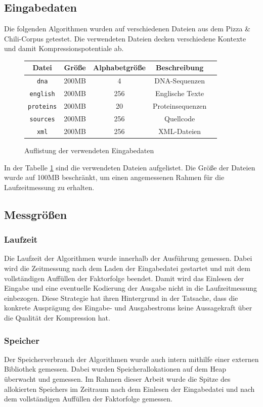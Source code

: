 \subsection{Eingabedaten}
Die folgenden Algorithmen wurden auf verschiedenen Dateien aus dem Pizza \& Chili-Corpus getestet. Die verwendeten Dateien decken verschiedene Kontexte und damit
Kompressionspotentiale ab.
\begin{figure}[ht]
    \centering
    \caption{Auflistung der verwendeten Eingabedaten}
    \label{inputdata}
    \begin{tabular}{|c|c|c|c|c|}
        \hline
        \textbf{Datei} & \textbf{Größe} & \textbf{Alphabetgröße} & \textbf{Beschreibung} \\
        \hline
        \texttt{dna} & 200MB & 4 & DNA-Sequenzen \\
        \hline
        \texttt{english} & 200MB & 256 & Englische Texte \\
        \hline
        \texttt{proteins} & 200MB & 20 & Proteinsequenzen \\
        \hline
        \texttt{sources} & 200MB & 256 & Quellcode \\
        \hline
        \texttt{xml} & 200MB & 256 & XML-Dateien \\
        \hline
    \end{tabular}
\end{figure}
In der Tabelle \ref{inputdata} sind die verwendeten Dateien aufgelistet. Die Größe der Dateien wurde auf 100MB beschränkt, um einen angemessenen Rahmen für die 
Laufzeitmessung zu erhalten.

\subsection{Messgrößen}

\subsubsection{Laufzeit}
Die Laufzeit der Algorithmen wurde innerhalb der Ausführung gemessen. Dabei wird die Zeitmessung nach dem Laden der Eingabedatei gestartet und mit dem vollständigen
Auffüllen der Faktorfolge beendet. Damit wird das Einlesen der Eingabe und eine eventuelle Kodierung der Ausgabe nicht in die Laufzeitmessung einbezogen. Diese Strategie
hat ihren Hintergrund in der Tatsache, dass die konkrete Ausprägung des Eingabe- und Ausgabestroms keine Aussagekraft über die Qualität der Kompression hat.

\subsubsection{Speicher}
Der Speicherverbrauch der Algorithmen wurde auch intern mithilfe einer externen Bibliothek gemessen. Dabei wurden Speicherallokationen auf dem Heap überwacht und 
gemessen. Im Rahmen dieser Arbeit wurde die Spitze des allokierten Speichers im Zeitraum nach dem Einlesen der Eingabedatei und nach dem vollständigen Auffüllen der
Faktorfolge gemessen.

